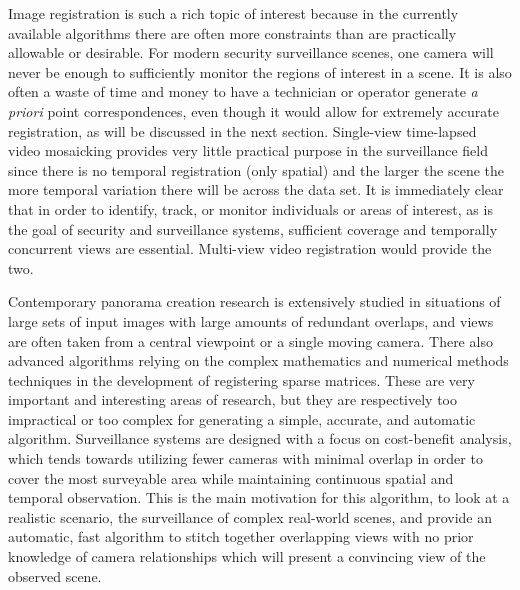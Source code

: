 %
%
%
%
%
%
%
%
%

%
%
%


Image registration is such a rich topic of interest because in the currently available algorithms there are often more constraints than are practically allowable or desirable. For modern security surveillance scenes, one camera will never be enough to sufficiently monitor the regions of interest in a scene. It is also often a waste of time and money to have a technician or operator generate \textit{a priori} point correspondences, even though it would allow for extremely accurate registration, as will be discussed in the next section. Single-view time-lapsed video mosaicking provides very little practical purpose in the surveillance field since there is no temporal registration (only spatial) and the larger the scene the more temporal variation there will be across the data set. It is immediately clear that in order to identify, track, or monitor individuals or areas of interest, as is the goal of security and surveillance systems, sufficient coverage and temporally concurrent views are essential. Multi-view video registration would provide the two.

Contemporary panorama creation research is extensively studied in situations of large sets of input images with large amounts of redundant overlaps, and views are often taken from a central viewpoint or a single moving camera. There also advanced algorithms relying on the complex mathematics and numerical methods techniques in the development of registering sparse matrices. These are very important and interesting areas of research, but they are respectively too impractical or too complex for generating a simple, accurate, and automatic algorithm. Surveillance systems are designed with a focus on cost-benefit analysis, which tends towards utilizing fewer cameras with minimal overlap in order to cover the most surveyable area while maintaining continuous spatial and temporal observation. This is the main motivation for this algorithm, to look at a realistic scenario, the surveillance of complex real-world scenes, and provide an automatic, fast algorithm to stitch together overlapping views with no prior knowledge of camera relationships which will present a convincing view of the observed scene.

